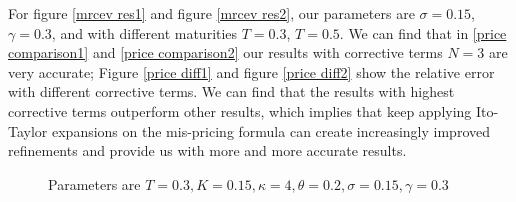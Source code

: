 For figure \ref{mrcev res1} and figure \ref{mrcev res2}, our parameters are $\sigma=0.15$, $\gamma=0.3$, and with different maturities $T=0.3$, $T=0.5$. We can find that in \ref{price comparison1} and \ref{price comparison2} our results with corrective terms $N=3$ are very accurate; Figure \ref{price diff1} and figure \ref{price diff2} show the relative error with different corrective terms. We can find that the results with highest corrective terms outperform other results, which implies that keep applying Ito-Taylor expansions on the mis-pricing formula can create increasingly improved refinements and provide us with more and more accurate results.

\begin{figure}[ht]
    \centering
    \hfill
    \caption{Parameters are $T=0.3,K=0.15, \kappa=4,\theta=0.2, \sigma=0.15, \gamma=0.3$}
  \end{figure}\label{mrcev res1}

